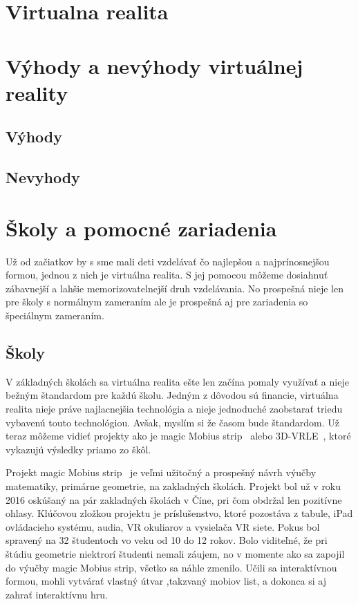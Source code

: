 \documentclass[10pt,twoside,slovak,a4paper]{article}
\begin{document}
\section{Virtualna realita} \label{realita}

 

\begin{figure*}[tbh]

\end{figure*}



\section{Výhody a nevýhody virtuálnej reality} \label{procon}


\subsection{Výhody} \label{procon:vyhody}



\subsection{Nevyhody} \label{procon:nevyhody}


\section{Školy a pomocné zariadenia} \label{školy}
Už od začiatkov by s sme mali deti vzdelávať čo najlepšou a najprínosnejšou formou, jednou z nich je virtuálna realita. S jej pomocou môžeme dosiahnuť zábavnejší a lahšie memorizovatelnejší druh vzdelávania. No prospešná nieje len pre školy s normálnym zameraním ale je prospešná aj pre zariadenia so špeciálnym zameraním. 

\subsection{Školy} \label{školy:školy}
V základných školách sa virtuálna realita ešte len začína pomaly využívať a nieje bežným štandardom pre každú školu. Jedným z dôvodou sú financie, virtuálna realita nieje práve najlacnejšia technológia a nieje jednoduché zaobstarať triedu vybavenú touto technológiou. Avšak, myslím si že časom bude štandardom. Už teraz môžeme vidieť projekty ako je magic Mobius strip~\cite{Math} alebo 3D-VRLE~\cite{Physics}, ktoré vykazujú výsledky priamo zo škôl. 

Projekt magic Mobius strip~\cite{Math} je veľmi užitočný a prospešný návrh výučby matematiky, primárne geometrie, na zakladných školách. Projekt bol už v roku 2016 oskúšaný na pár zakladných školách v Číne, pri čom obdržal len pozitívne ohlasy. Klúčovou zložkou projektu je príslušenstvo, ktoré pozostáva z tabule, iPad ovládacieho systému, audia, VR okuliarov a vysielača VR siete. Pokus bol spravený na 32 študentoch vo veku od 10 do 12 rokov. Bolo viditeľné, že pri štúdiu geometrie niektrorí študenti nemali záujem, no v momente ako sa zapojil do výučby magic Mobius strip, všetko sa náhle zmenilo. Učili sa interaktívnou formou, mohli vytvárať vlastný útvar ,takzvaný mobiov list, a dokonca si aj zahrať interaktívnu hru.
\end{document}
